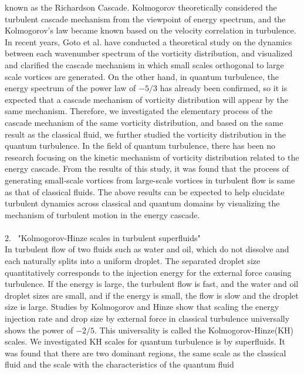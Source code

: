 \documentclass[12pt,a4paper]{jbook}
\begin{document}
    known as the Richardson Cascade.
    Kolmogorov theoretically considered the turbulent cascade mechanism from the viewpoint of energy spectrum,
    and the Kolmogorov's law became known based on the velocity correlation in turbulence.
    In recent years,
    Goto et al. have conducted a theoretical study on the dynamics between each wavenumber spectrum of the vorticity distribution,
    and visualized and clarified the cascade mechanism in which small scales orthogonal to large scale vortices are generated.
    On the other hand,
    in quantum turbulence,
    the energy spectrum of the power law of $-5/3$ has already been confirmed,
    so it is expected that a cascade mechanism of vorticity distribution will appear by the same mechanism.
    Therefore,
    we investigated the elementary process of the cascade mechanism of the same vorticity distribution,
    and based on the same result as the classical fluid,
    we further studied the vorticity distribution in the quantum turbulence.
    In the field of quantum turbulence,
    there has been no research focusing on the kinetic mechanism of vorticity distribution related to the energy cascade.
    From the results of this study,
    it was found that the process of generating small-scale vortices from large-scale vortices in turbulent flow
    is same as that of classical fluids.
    The above results can be expected to help elucidate turbulent dynamics
    across classical and quantum domains by visualizing the mechanism of turbulent motion in the energy cascade. 
    \\
    \\
    2. \ "Kolmogorov-Hinze scales in turbulent superfluids"
    \\
    In turbulent flow of two fluids such as water and oil,
    which do not dissolve and each naturally splits into a uniform droplet.
    The separated droplet size quantitatively corresponds to the injection energy for the external force causing turbulence. 
    If the energy is large,
    the turbulent flow is fast,
    and the water and oil droplet sizes are small,
    and if the energy is small,
    the flow is slow and the droplet size is large.
    Studies by Kolmogorov and Hinze show that scaling the energy injection rate
    and drop size by external force in classical turbulence universally shows the power of $-2/5$.
    This universality is called the Kolmogorov-Hinze(KH) scales.
    We investigated KH scales for quantum turbulence is by superfluids.
    It was found that there are two dominant regions,
    the same scale as the classical fluid and the scale with the characteristics of the quantum fluid
\end{document}
